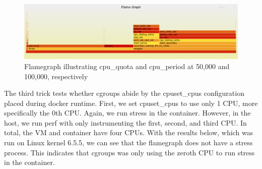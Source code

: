 \documentclass{report}  %
\begin{document}
\begin{figure}[H]
    \centering
    \includegraphics[width=\textwidth]{cpu_tricks/6.5.5/V1/flamegraph_20241022_175446.png}
    \caption{Flamegraph illustrating cpu\_quota and cpu\_period at 50,000 and 100,000, respectively}
    \label{fig:flamegraph}
\end{figure}


\large{
  The third trick tests whether cgroups abide by the cpuset\_cpus configuration placed during docker runtime. First, we set cpuset\_cpus to use only 1 CPU, more specifically the 0th CPU. Again, we run stress in the container. However, in the host, we run perf with only instrumenting the first, second, and third CPU. In total, the VM and container have four CPUs. With the results below, which was run on Linux kernel 6.5.5, we can see that the flamegraph does not have a stress process. This indicates that cgroups was only using the zeroth CPU to run stress in the container. 
}
\end{document}
